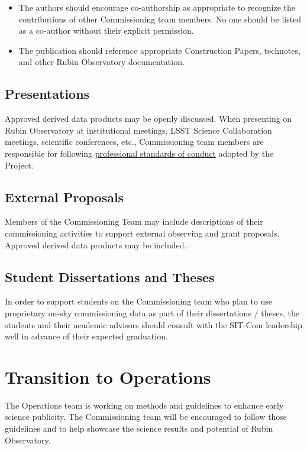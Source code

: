 \documentclass[SE,authoryear,toc,lsstdraft]{lsstdoc}
\begin{document}
\begin{itemize}
  \item The authors should encourage co-authorship as appropriate to recognize the contributions of other Commissioning team members. No one should be listed as a co-author without their explicit permission.

  \item The publication should reference appropriate Construction Papers, technotes, and other Rubin Observatory documentation.

\end{itemize}

\subsection{Presentations}

Approved derived data products may be openly discussed. When presenting on Rubin Observatory at institutional meetings, LSST Science Collaboration meetings, scientific conferences, etc., Commissioning team members are responsible for following \href{https://www.lsst.org/scientists/codes-of-conduct}{professional standards of conduct} adopted by the Project.

\subsection{External Proposals}

Members of the Commissioning Team may include descriptions of their commissioning activities to support external observing and grant proposals. Approved derived data products may be included.

\subsection{Student Dissertations and Theses}

In order to support students on the Commissioning team who plan to use proprietary on-sky commissioning data as part of their dissertations / theses, the students and their academic advisors should consult with the SIT-Com leadership well in advance of their expected graduation.

\section{Transition to Operations}
\label{operations}

The Operations team is working on methods and guidelines to enhance early science publicity. The Commissioning team will be encouraged to follow those guidelines and to help showcase the science results and potential of Rubin Observatory.
\end{document}
